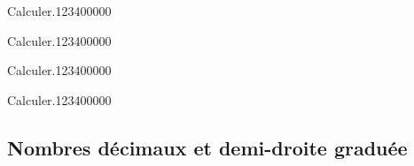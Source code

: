 \begin{pageAD} 



\begin{ExoCad}{Calculer.}{1234}{0}{0}{0}{0}{0}

\end{ExoCad}


\begin{ExoCad}{Calculer.}{1234}{0}{0}{0}{0}{0}

\end{ExoCad}


\begin{ExoCad}{Calculer.}{1234}{0}{0}{0}{0}{0}

\end{ExoCad}


\begin{ExoCad}{Calculer.}{1234}{0}{0}{0}{0}{0}

\end{ExoCad}

\end{pageAD} 
\begin{pageCours} 


\section{Nombres décimaux et demi-droite graduée}

 
\end{pageCours}
